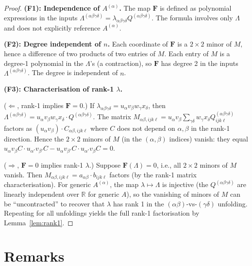 \documentclass[12pt]{article}
\theoremstyle{definition}
\theoremstyle{remark}
\begin{document}
\begin{proof}
\textbf{(F1): Independence of $A^{(\alpha)}$.}
The map $\mathbf{F}$ is defined as polynomial expressions in the inputs
$\Lambda^{(\alpha\beta\gamma\delta)} = \lambda_{\alpha\beta\gamma\delta}
Q^{(\alpha\beta\gamma\delta)}$.  The formula involves only $\Lambda$ and
does not explicitly reference $A^{(\alpha)}$.  \checkmark

\textbf{(F2): Degree independent of $n$.}
Each coordinate of $\mathbf{F}$ is a $2\times 2$ minor of $M$, hence a
difference of two products of two entries of $M$.  Each entry of $M$ is a
degree-1 polynomial in the $\Lambda$'s (a contraction), so $\mathbf{F}$ has
degree 2 in the inputs $\Lambda^{(\alpha\beta\gamma\delta)}$.  The degree is
independent of $n$.  \checkmark

\textbf{(F3): Characterisation of rank-1 $\lambda$.}

($\Leftarrow$, rank-1 implies $\mathbf{F}=0$.)
If $\lambda_{\alpha\beta\gamma\delta} = u_\alpha v_\beta w_\gamma x_\delta$,
then $\Lambda^{(\alpha\beta\gamma\delta)} = u_\alpha v_\beta w_\gamma x_\delta
\cdot Q^{(\alpha\beta\gamma\delta)}$.  The matrix $M_{\alpha\beta,ijk\ell}
= u_\alpha v_\beta \sum_{\gamma\delta}w_\gamma x_\delta Q^{(\alpha\beta\gamma\delta)}_{ijk\ell}$
factors as $(u_\alpha v_\beta)\cdot C_{\alpha\beta,ijk\ell}$ where $C$ does
not depend on $\alpha,\beta$ in the rank-1 direction.  Hence the $2\times 2$
minors of $M$ (in the $(\alpha,\beta)$ indices) vanish: they equal
$u_\alpha v_\beta C \cdot u_{\alpha'} v_{\beta'} C - u_\alpha v_{\beta'} C \cdot u_{\alpha'} v_\beta C = 0$.

($\Rightarrow$, $\mathbf{F}=0$ implies rank-1 $\lambda$.)
Suppose $\mathbf{F}(\Lambda)=0$, i.e., all $2\times 2$ minors of $M$ vanish.
Then $M_{\alpha\beta,ijk\ell} = a_{\alpha\beta}\cdot b_{ijk\ell}$ factors
(by the rank-1 matrix characterisation).  For generic $A^{(\alpha)}$, the
map $\lambda\mapsto\Lambda$ is injective (the $Q^{(\alpha\beta\gamma\delta)}$
are linearly independent over $\mathbb{R}$ for generic $A$), so the vanishing
of minors of $M$ can be ``uncontracted'' to recover that $\lambda$ has rank 1
in the $(\alpha\beta)$-vs-$(\gamma\delta)$ unfolding.  Repeating for all
unfoldings yields the full rank-1 factorisation by Lemma~\ref{lem:rank1}.
\end{proof}

\section{Remarks}
\end{document}
